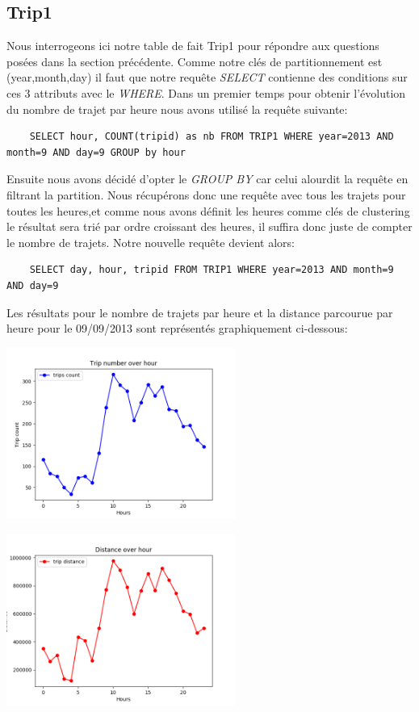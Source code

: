 \documentclass[]{report}
\begin{document}
	\subsection{Trip1}
	Nous interrogeons ici notre table de fait Trip1 pour répondre aux questions posées dans la section précédente. Comme notre clés de partitionnement est (year,month,day) il faut que notre requête \textit{SELECT} contienne des conditions sur ces 3 attributs avec le \textit{WHERE}. Dans un premier temps pour obtenir l'évolution du nombre de trajet par heure nous avons utilisé la requête suivante:
	\begin{lstlisting}
	SELECT hour, COUNT(tripid) as nb FROM TRIP1 WHERE year=2013 AND month=9 AND day=9 GROUP by hour
	\end{lstlisting}
	Ensuite nous avons décidé d'opter le \textit{GROUP BY} car celui alourdit la requête en filtrant la partition. Nous récupérons donc une requête avec tous les trajets pour toutes les heures,et comme nous avons définit les heures comme clés de clustering le résultat sera trié par ordre croissant des heures, il suffira donc juste de compter le nombre de trajets. Notre nouvelle requête devient alors:
	\begin{lstlisting}
	SELECT day, hour, tripid FROM TRIP1 WHERE year=2013 AND month=9 AND day=9
	\end{lstlisting}
	Les résultats pour le nombre de trajets par heure et la distance parcourue par heure pour le 09/09/2013 sont représentés graphiquement ci-dessous:\\
	\begin{minipage}{.5\textwidth}
		\includegraphics[width=75mm]{Figures/trips_by_day.png}
	\end{minipage}%
	\hspace{0.06\linewidth}
	\begin{minipage}{.5\textwidth}
		\includegraphics[width=75mm]{Figures/distance_by_day.png}
	\end{minipage}
	
\end{document}
